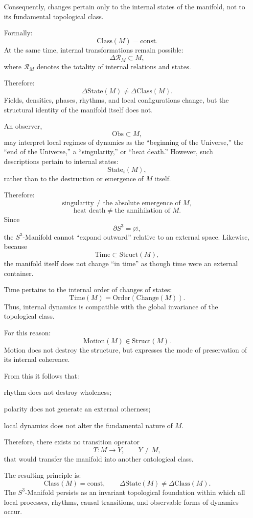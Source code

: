 \documentclass[12pt,a4paper]{article}
\theoremstyle{definition}
\begin{document}
Consequently, changes pertain only to the internal states of the manifold, not to its fundamental topological class.

Formally:
\[
\mathrm{Class}(M)=\mathrm{const}.
\]
At the same time, internal transformations remain possible:
\[
\Delta\mathcal R_M\subset M,
\]
where \(\mathcal R_M\) denotes the totality of internal relations and states.

Therefore:
\[
\Delta\mathrm{State}(M)\neq \Delta\mathrm{Class}(M).
\]
Fields, densities, phases, rhythms, and local configurations change, but the structural identity of the manifold itself does not.

An observer,
\[
\mathrm{Obs}\subset M,
\]
may interpret local regimes of dynamics as the ``beginning of the Universe,'' the ``end of the Universe,'' a ``singularity,'' or ``heat death.'' However, such descriptions pertain to internal states:
\[
\mathrm{State}_i(M),
\]
rather than to the destruction or emergence of \(M\) itself.

Therefore:
\[
\text{singularity}
\neq
\text{the absolute emergence of } M,
\]
\[
\text{heat death}
\neq
\text{the annihilation of } M.
\]
Since
\[
\partial S^3=\varnothing,
\]
the \(S^3\)-Manifold cannot ``expand outward'' relative to an external space. Likewise, because
\[
\mathrm{Time}\subset \mathrm{Struct}(M),
\]
the manifold itself does not change ``in time'' as though time were an external container.

Time pertains to the internal order of changes of states:
\[
\mathrm{Time}(M)=\mathrm{Order}(\mathrm{Change}(M)).
\]
Thus, internal dynamics is compatible with the global invariance of the topological class.

For this reason:
\[
\mathrm{Motion}(M)\in \mathrm{Struct}(M).
\]
Motion does not destroy the structure, but expresses the mode of preservation of its internal coherence.

From this it follows that:

rhythm does not destroy wholeness;

polarity does not generate an external otherness;

local dynamics does not alter the fundamental nature of \(M\).

Therefore, there exists no transition operator
\[
T:M\to Y,
\qquad
Y\neq M,
\]
that would transfer the manifold into another ontological class.

The resulting principle is:
\[
\mathrm{Class}(M)=\mathrm{const},
\qquad
\Delta\mathrm{State}(M)\neq \Delta\mathrm{Class}(M).
\]
The \(S^3\)-Manifold persists as an invariant topological foundation within which all local processes, rhythms, causal transitions, and observable forms of dynamics occur.
\end{document}
